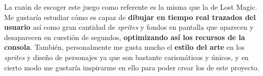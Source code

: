 \vspace{0.5cm}

La razón de escoger este juego como referente es la misma que la de Lost Magic. Me gustaría estudiar cómo es capaz de \textbf{dibujar en tiempo real trazados del usuario} así como gran cantidad de \textit{sprites} y fondos en pantalla que aparecen y desaparecen en cuestión de segundos, \textbf{optimizando así los recursos de la consola}. También, personalmente me gusta mucho el \textbf{estilo del arte} en los \textit{sprites} y diseño de personajes ya que son bastante carismáticos y únicos, y en cierto modo me gustaría inspirarme en ello para poder crear los de este proyecto.

\vspace{1cm}
